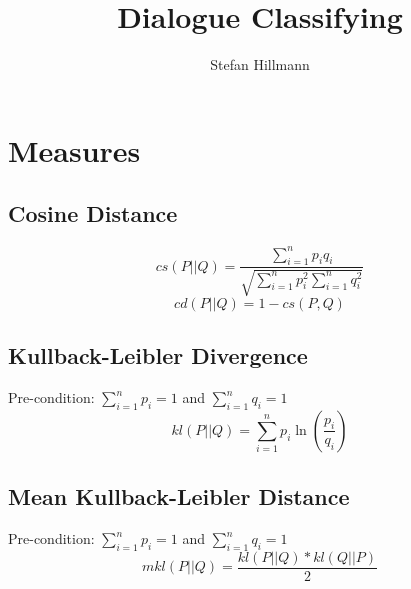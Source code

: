 \documentclass[10pt,a4paper]{article}
\author{Stefan Hillmann}
\title{Dialogue Classifying}
\begin{document}
\maketitle

\section{Measures}
\subsection{Cosine Distance}
\begin{equation}
  cs(P||Q)=\frac{ \sum\limits_{i=1}^n p_i q_i }{ \sqrt{ \sum\limits_{i=1}^n p_i^2 \sum\limits_{i=1}^n q_i^2 } }
\end{equation}
\begin{equation}
  cd(P||Q) = 1-cs(P,Q)
\end{equation}

\subsection{Kullback-Leibler Divergence}
Pre-condition: $\sum\limits_{i=1}^n p_i = 1$ and $\sum\limits_{i=1}^n q_i = 1$
\begin{equation}
  kl(P||Q) = \sum\limits_{i=1}^n p_i \ln\left(\frac{p_i}{q_i}\right)
\end{equation}

\subsection{Mean Kullback-Leibler Distance}
Pre-condition: $\sum\limits_{i=1}^n p_i = 1$ and $\sum\limits_{i=1}^n q_i = 1$
\begin{equation}
  mkl(P||Q) = \frac{kl(P||Q)*kl(Q||P)}{2}
\end{equation}
\end{document}
